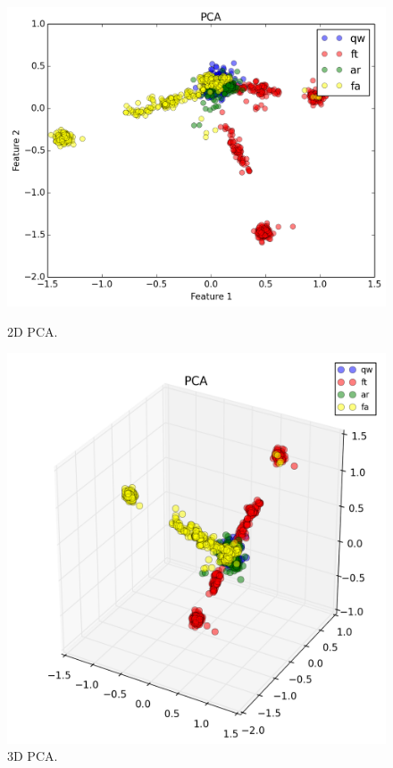 \begin{figure}
\centering
\begin{minipage}{.23\textwidth}
\includegraphics[width=1\textwidth]{img/easy_pca_2d}
\caption{2D PCA.}
\label{fig:4cat_2d_pca}
\end{minipage}
\begin{minipage}{.23\textwidth}
\includegraphics[width=1\textwidth]{img/easy_pca_3d}
\caption{3D PCA.}
\label{fig:4cat_3d_pca}
\end{minipage}
\end{figure}

